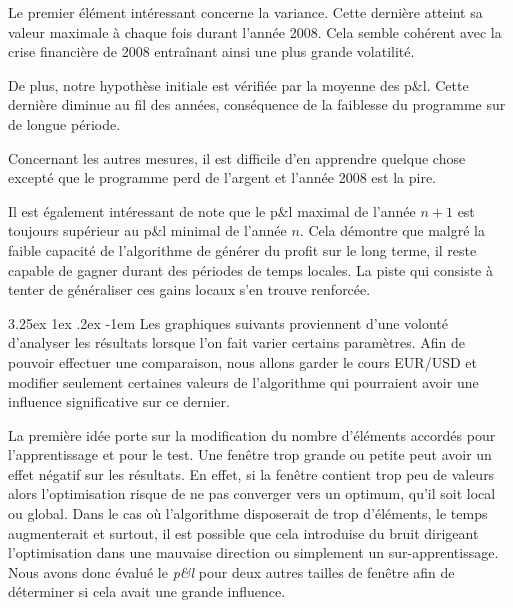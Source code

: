 \documentclass[a4paper, 11pt]{article}
\makeatletter
\renewcommand\paragraph{\@startsection{paragraph}{5}{\z@}%
  {3.25ex \@plus1ex \@minus.2ex}%
  {-1em}%
  {\normalfont\normalsize\bfseries}}
\makeatother
\begin{document}
Le premier élément intéressant concerne la variance. Cette dernière atteint sa valeur maximale à chaque fois durant l'année 2008. Cela semble cohérent avec la crise financière de 2008 entraînant ainsi une plus grande volatilité.

De plus, notre hypothèse initiale est vérifiée par la moyenne des p\&l. Cette dernière diminue au fil des années, conséquence de la faiblesse du programme sur de longue période.

Concernant les autres mesures, il est difficile d'en apprendre quelque chose excepté que le programme perd de l'argent et l'année 2008 est la pire.

Il est également intéressant de note que le p\&l maximal de l'année $n+1$ est toujours supérieur au p\&l minimal de l'année $n$. Cela démontre que malgré la faible capacité de l'algorithme de générer du profit sur le long terme, il reste capable de gagner durant des périodes de temps locales. La piste qui consiste à tenter de généraliser ces gains locaux s'en trouve renforcée.

\paragraph{}
Les graphiques suivants proviennent d'une volonté d'analyser les résultats lorsque l'on fait varier certains paramètres. Afin de pouvoir effectuer une comparaison, nous allons garder le cours EUR/USD et modifier seulement certaines valeurs de l'algorithme qui pourraient avoir une influence significative sur ce dernier.

La première idée porte sur la modification du nombre d'éléments accordés pour l'apprentissage et pour le test. Une fenêtre trop grande ou petite peut avoir un effet négatif sur les résultats. En effet, si la fenêtre contient trop peu de valeurs alors l'optimisation risque de ne pas converger vers un optimum, qu'il soit local ou global. Dans le cas où l'algorithme disposerait de trop d'éléments, le temps augmenterait et surtout, il est possible que cela introduise du bruit dirigeant l'optimisation dans une mauvaise direction ou simplement un sur-apprentissage. Nous avons donc évalué le \textit{p\&l} pour deux autres tailles de fenêtre afin de déterminer si cela avait une grande influence.
\end{document}

